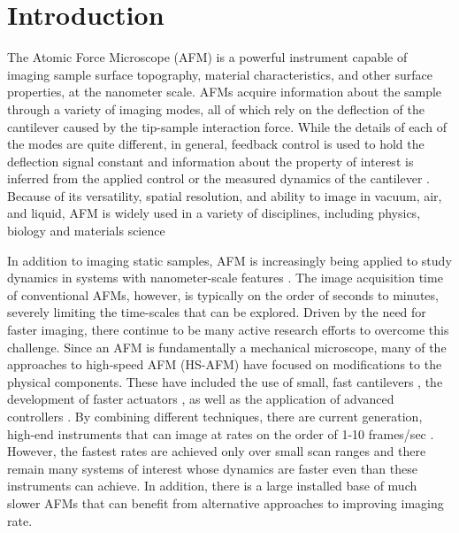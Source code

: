 \documentclass[twocolumn,oneside]{IEEEtran/IEEEtran}
\begin{document}
\section{Introduction}\label{sec:introduction}






The Atomic Force Microscope (AFM) is a powerful instrument capable of imaging
sample surface topography, material characteristics, and other surface
properties, at the nanometer scale. AFMs acquire information about the sample
through a variety of imaging modes, all of which rely on the deflection of the
cantilever caused by the tip-sample interaction force. While the details of each
of the modes are quite different, in general, feedback control is used to hold
the deflection signal constant and information about the property of interest is
inferred from the applied control or the measured dynamics of the cantilever
\cite{Abramovitch:2007gt}. Because of its versatility, spatial resolution, and
ability to image in vacuum, air, and liquid, AFM is widely used in a variety of
disciplines, including physics, biology and materials science
\cite{Dufrene:2017gm,Yang:2017im,Payton:2016hj,Altman:2015ic,Haase:2015eh}
	
In addition to imaging static samples, AFM is increasingly being applied to
study dynamics in systems with nanometer-scale features
\cite{Yang:2017im,Shibata:2017da,Shibata:2015jd,Ando:2014ja}. The image
acquisition time of conventional AFMs, however, is typically on the order of
seconds to minutes, severely limiting the time-scales that can be explored.
Driven by the need for faster imaging, there continue to be many active research
efforts to overcome this challenge. Since an AFM is fundamentally a mechanical
microscope, many of the approaches to high-speed AFM (HS-AFM) have focused on
modifications to the physical components. These have included the use of small,
fast cantilevers \cite{viani1999fast, braunsmann2010high,Adams:2016hg}, the
development of faster actuators \cite{Maroufi:2015gt,Yong:2012kd,Kenton:2012cm},
as well as the application of advanced controllers
\cite{Rana:2018es,Yong:2015gr,butterworth2010adaptive,salapaka2002high}. By
combining different techniques, there are current generation, high-end
instruments that can image at rates on the order of 1-10 frames/sec
\cite{Ando:2014ja}. However, the fastest rates are achieved only over small scan
ranges and there remain many systems of interest whose dynamics are faster even
than these instruments can achieve. In addition, there is a large installed base
of much slower AFMs that can benefit from alternative approaches to improving
imaging rate.
	
\end{document}
